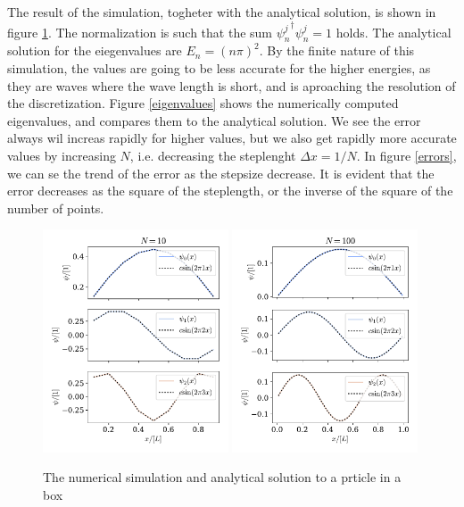 \documentclass{article}
\begin{document}
    The result of the simulation, togheter with the analytical solution, is shown in figure \ref{fig:particel in box}. The normalization is such that the sum ${\psi_n^{j}}^\dagger\psi_n^{j} = 1$ holds. The analytical solution for the eiegenvalues are $E_n = (n \pi)^2$. By the finite nature of this simulation, the values are going to be less accurate for the higher energies, as they are waves where the wave length is short, and is aproaching the resolution of the discretization. Figure \ref{eigenvalues} shows the numerically computed eigenvalues, and compares them to the analytical solution. We see the error always wil increas rapidly for higher values, but we also get rapidly more accurate values by increasing $N$, i.e. decreasing the steplenght $\Delta x = 1 / N$. In figure \ref{errors}, we can se the trend of the error as the stepsize decrease. It is evident that the error decreases as the square of the steplength, or the inverse of the square of the number of points.

    \begin{figure}[h]
        \centering
        \includegraphics[width=0.49\textwidth]{particle_in_box/vector_N=10}
        \includegraphics[width=0.49\textwidth]{particle_in_box/vector_N=100}
        \caption{The numerical simulation and analytical solution to a prticle in a box}
        \label{fig:particel in box}
    \end{figure}
\end{document}
